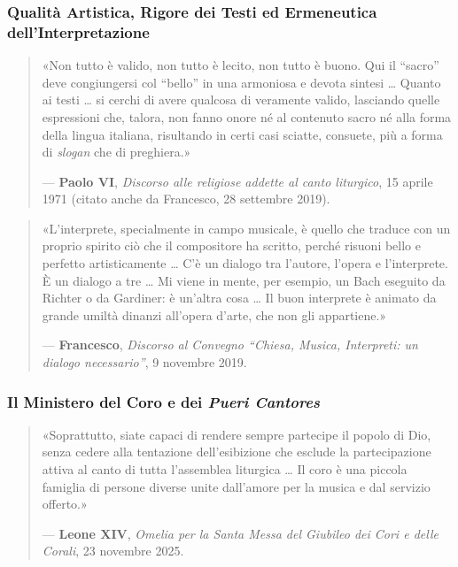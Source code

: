 \documentclass[12pt,a4paper]{article}
\begin{document}
	\subsubsection{Qualità Artistica, Rigore dei Testi ed Ermeneutica dell'Interpretazione}\label{qualita-artistica-rigore-dei-testi-ed-ermeneutica-dellinterpretazione}
	
	\begin{quote}
		«Non tutto è valido, non tutto è lecito, non tutto è buono. Qui il ``sacro'' deve congiungersi col ``bello'' in una armoniosa e devota sintesi \ldots{} Quanto ai testi \ldots{} si cerchi di avere qualcosa di veramente valido, lasciando quelle espressioni che, talora, non fanno onore né al contenuto sacro né alla forma della lingua italiana, risultando in certi casi sciatte, consuete, più a forma di \emph{slogan} che di preghiera.»
		
		--- \textbf{Paolo VI}, \emph{Discorso alle religiose addette al canto liturgico}, 15 aprile 1971 (citato anche da Francesco, 28 settembre 2019).
	\end{quote}
	
	\begin{quote}
		«L'interprete, specialmente in campo musicale, è quello che traduce con un proprio spirito ciò che il compositore ha scritto, perché risuoni bello e perfetto artisticamente \ldots{} C'è un dialogo tra l'autore, l'opera e l'interprete. È un dialogo a tre \ldots{} Mi viene in mente, per esempio, un Bach eseguito da Richter o da Gardiner: è un'altra cosa \ldots{} Il buon interprete è animato da grande umiltà dinanzi all'opera d'arte, che non gli appartiene.»
		
		--- \textbf{Francesco}, \emph{Discorso al Convegno ``Chiesa, Musica, Interpreti: un dialogo necessario''}, 9 novembre 2019.
	\end{quote}
	
	\subsubsection{Il Ministero del Coro e dei \emph{Pueri Cantores}}\label{il-ministero-del-coro-e-dei-pueri-cantores}
	
	\begin{quote}
		«Soprattutto, siate capaci di rendere sempre partecipe il popolo di Dio, senza cedere alla tentazione dell'esibizione che esclude la partecipazione attiva al canto di tutta l'assemblea liturgica \ldots{} Il coro è una piccola famiglia di persone diverse unite dall'amore per la musica e dal servizio offerto.»
		
		--- \textbf{Leone XIV}, \emph{Omelia per la Santa Messa del Giubileo dei Cori e delle Corali}, 23 novembre 2025.
	\end{quote}
	
\end{document}
